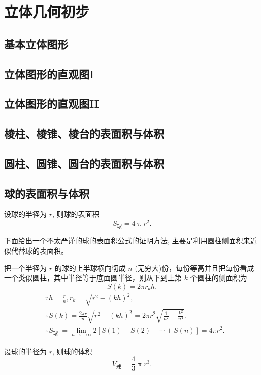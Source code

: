 \chapter{立体几何初步}
\section{基本立体图形}
\section{立体图形的直观图I}
\section{立体图形的直观图II}
\section{棱柱、棱锥、棱台的表面积与体积}
\section{圆柱、圆锥、圆台的表面积与体积}
\section{球的表面积与体积}
\begin{formula}[球的表面积]
	设球的半径为 $r$, 则球的表面积
	$$
		S_{\text{球}}= 4 \uppi r^{2}.
	$$
\end{formula}
下面给出一个不太严谨的球的表面积公式的证明方法, 主要是利用圆柱侧面积来近似代替球的表面积。
\begin{note}
  把一个半径为 $r$ 的球的上半球横向切成 $n$ (无穷大)份，每份等高并且把每份看成一个类似圆柱，其中半径等于底面圆半径，则从下到上第 $k$ 个圆柱的侧面积为
  $$
  S(k)=2 \pi r_k h .
  $$
  $$
  \begin{aligned}
  & \because h=\frac{r}{n}, r_k=\sqrt{r^2-(k h)^2}, \\
  & \therefore S(k)=\frac{2 \pi r}{n} \sqrt{r^2-(k h)^2}=2 \pi r^2 \sqrt{\frac{1}{n^2}-\frac{k^2}{n^4}} . \\
  & \therefore S_{\text {球 }}=\lim _{n \rightarrow+\infty} 2[S(1)+S(2)+\cdots+S(n)]=4 \pi r^2 .
  \end{aligned}
  $$
\end{note}  

\begin{formula}[球的体积]
	设球的半径为 $r$, 则球的体积
  $$
  V_{\text{球}}=\frac{4}{3} \uppi r^{3}.
  $$
\end{formula}

